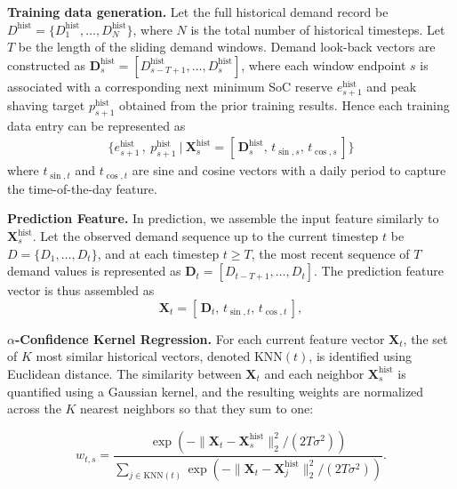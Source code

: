 \documentclass[conference]{IEEEtran}
\begin{document}
\textbf{Training data generation.} Let the full historical demand record be \(D^{\text{hist}} = \{D^{\text{hist}}_1,\dots,D^{\text{hist}}_N\}\), where \(N\) is the total number of historical timesteps. Let $T$ be the length of the sliding demand windows. Demand look-back vectors are constructed as $\mathbf{D}^{\text{hist}}_s = [D^{\text{hist}}_{s-T+1}, \dots, D^{\text{hist}}_s]$, where each window endpoint $s$ is associated with a corresponding next minimum SoC reserve $e^{\text{hist}}_{s+1}$ and peak shaving target $p^{\text{hist}}_{s+1}$ obtained from the prior training results. Hence each training data entry can be represented as
\begin{align}
    \{e^{\text{hist}}_{s+1}\, , \ p^{\text{hist}}_{s+1} \ | \ \mathbf{X}^{\text{hist}}_s = [\, \mathbf{D}^{\text{hist}}_s,\, t_{\sin,s},\, t_{\cos,s} \,] \}
\end{align}
where $t_{\sin,t}$ and $t_{\cos,t}$ are sine and cosine vectors with a daily period to capture the time-of-the-day feature.

\textbf{Prediction Feature.} In prediction, we assemble the input feature similarly to $\mathbf{X}^{\text{hist}}_s$. Let the observed demand sequence up to the current timestep \(t\) be \(D = \{D_1,\dots,D_t\}\), and at each timestep $t \ge T$, the most recent sequence of $T$ demand values is represented as $\mathbf{D}_t = [D_{t-T+1}, \dots, D_t]$. The prediction feature vector is thus assembled as
\begin{equation}
\mathbf{X}_t = [\, \mathbf{D}_t,\, t_{\sin,t},\, t_{\cos,t} \,],
\end{equation}

\textbf{$\alpha$-Confidence Kernel Regression.} For each current feature vector $\mathbf{X}_t$, the set of $K$ most similar historical vectors, denoted $\mathrm{KNN}(t)$, is identified using Euclidean distance.  
The similarity between $\mathbf{X}_t$ and each neighbor $\mathbf{X}^{\text{hist}}_s$ is quantified using a Gaussian kernel, and the resulting weights are normalized across the $K$ nearest neighbors so that they sum to one:

\begin{equation}\label{kernel_weights}
w_{t,s} = 
\frac{\exp \!\left( -\| \mathbf{X}_t - \mathbf{X}^{\text{hist}}_s \|_2^2 / (2T\sigma^2) \right)}
{\sum_{j \in \mathrm{KNN}(t)} \exp \!\left( -\| \mathbf{X}_t - \mathbf{X}^{\text{hist}}_j \|_2^2 / (2T\sigma^2) \right)}.
\end{equation}
\end{document}

